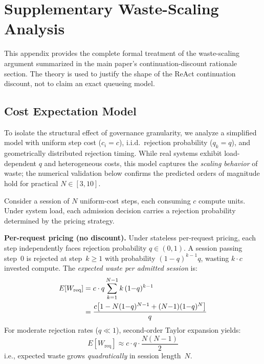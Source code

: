 \documentclass[sigconf,anonymous]{acmart}
\begin{document}
\section{Supplementary Waste-Scaling Analysis}
\label{sec:theory_proof}
\label{app:theory}

This appendix provides the complete formal treatment of the waste-scaling argument summarized in the main paper's continuation-discount rationale section. The theory is used to justify the shape of the ReAct continuation discount, not to claim an exact queueing model.

\subsection*{Cost Expectation Model}

To isolate the structural effect of governance granularity, we analyze a simplified model with uniform step cost ($c_i = c$), i.i.d.\ rejection probability ($q_k = q$), and geometrically distributed rejection timing. While real systems exhibit load-dependent $q$ and heterogeneous costs, this model captures the \emph{scaling behavior} of waste; the numerical validation below confirms the predicted orders of magnitude hold for practical $N \in [3,10]$.

Consider a session of $N$ uniform-cost steps, each consuming $c$ compute units. Under system load, each admission decision carries a rejection probability determined by the pricing strategy.

\textbf{Per-request pricing (no discount).}
Under stateless per-request pricing, each step independently faces rejection probability $q \in (0,1)$. A session passing step~0 is rejected at step~$k \geq 1$ with probability $(1{-}q)^{k-1}q$, wasting $k \cdot c$ invested compute. The \emph{expected waste per admitted session} is:
\begin{align}
E[W_{\text{req}}] &= c \cdot q \sum_{k=1}^{N-1} k\,(1{-}q)^{k-1} \notag\\
&= \frac{c\bigl[1 - N(1{-}q)^{N-1} + (N{-}1)(1{-}q)^N\bigr]}{q}
\label{eq:wreq}
\end{align}
For moderate rejection rates ($q \ll 1$), second-order Taylor expansion yields:
\begin{equation}
E[W_{\text{req}}] \approx c \cdot q \cdot \frac{N(N{-}1)}{2}
\label{eq:wreq_approx}
\end{equation}
i.e., expected waste grows \emph{quadratically} in session length~$N$.
\end{document}
